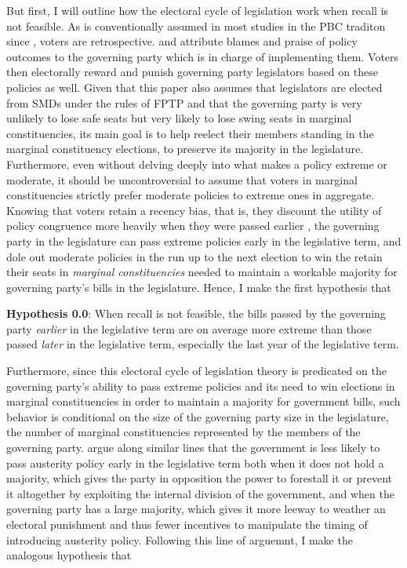 \documentclass{article}
\begin{document}
		But first, I will outline how the electoral cycle of legislation work
		when recall is not feasible.
		As is conventionally assumed in
		most studies in the PBC traditon since 
		\citeauthor{nordhausPoliticalBusinessCycle1975}
		\autocite*{nordhausPoliticalBusinessCycle1975},
		voters are retrospective.
		and
		attribute blames and praise of policy outcomes
		to the governing party which is
		in charge of implementing them.
		Voters then electorally reward and punish governing party legislators
		based on these policies as well.
		Given that this paper also assumes that
		legislators are elected from SMDs under the rules of FPTP
		and that the governing party is very unlikely to lose safe seats
		but very likely to lose swing seats in marginal constituencies,
		its main goal is to help reelect their members
		standing in the marginal constituency elections,
		to preserve its majority in the legislature.
		Furthermore,
		even without delving deeply into what makes a policy
		extreme or moderate,
		it should be uncontroversial to assume that
		voters in marginal constituencies
		strictly prefer moderate policies to extreme ones
		in aggregate.
		Knowing
		that voters
		retain a recency bias,
		that is,
		they
		discount the utility of policy congruence
		more heavily
		when they
		were passed earlier
		\autocite{healySubstitutingEndWhole2014,
			stroblElectoralCyclesGovernment2021},
		the governing party in the legislature
		can pass extreme policies early in the legislative term,
		and dole out moderate policies in the run up to the next election
		to win the retain their seats in \textit{marginal constituencies}
		needed to maintain a workable majority for governing party's bills
		in the legislature.
		Hence,
		I make the first hypothesis that
		
		\textbf{Hypothesis 0.0}: When recall is not feasible,
		the bills passed by the governing party
		\textit{earlier} in the legislative term are on average  
		more extreme than those passed \textit{later} in the legislative term,
		especially the last year of the legislative term.
		
		Furthermore,
		since
		this electoral cycle of legislation theory is predicated on
		the governing party's ability to pass extreme policies
		and its need to win elections
		in marginal constituencies
		in order to maintain a majority for government bills,
		such behavior is conditional on
		the size of the governing party size in the legislature,
		the number of marginal constituencies
		represented by the members of the governing party.
		\citeauthor{stroblElectoralCyclesGovernment2021}
		\autocite*{stroblElectoralCyclesGovernment2021}
		argue along similar lines that the government is less likely to pass austerity policy
		early in the legislative term
		both when it does not hold a majority,
		which gives the party in opposition the
		power to forestall it or prevent it altogether by exploiting the internal division of the government,
		and when the governing party has a large majority,
		which gives it more leeway to weather an electoral punishment
		and thus fewer incentives to manipulate the timing of introducing austerity policy.
		Following this line of arguemnt,
		I make the analogous hypothesis that
		
\end{document}

